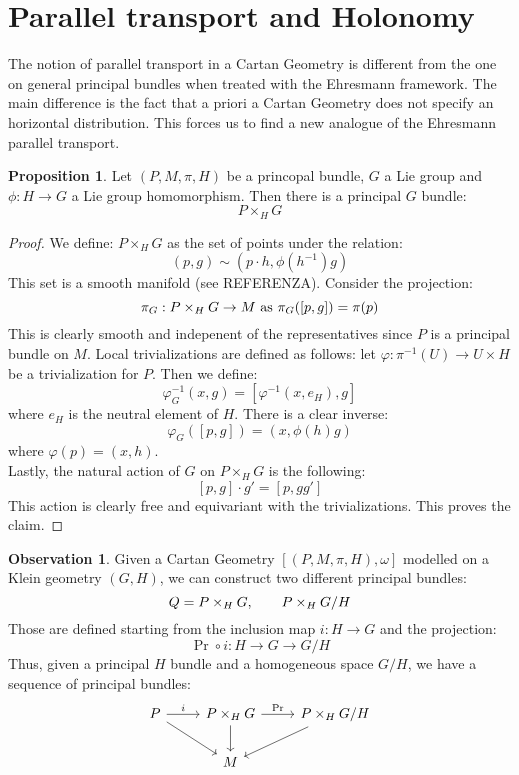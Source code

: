 \documentclass[12pt,a4paper]{report}
\theoremstyle{definition}
\theoremstyle{Theorem}
\newtheorem{Prop}[Def]{Proposition}
\theoremstyle{definition}
\theoremstyle{definition}
\newtheorem{Obs}[Def]{Observation}
\begin{document}
	\section{Parallel transport and Holonomy}
	The notion of parallel transport in a Cartan Geometry is different from the one on general principal bundles when treated with the Ehresmann framework. The main difference is the fact that a priori a Cartan Geometry does not specify an horizontal distribution. This forces us to find a new analogue of the Ehresmann parallel transport.
	\begin{Prop}
		Let $(P,M,\pi,H)$ be a princopal bundle, $G$ a Lie group and $\phi: H\rightarrow G$ a Lie group homomorphism. Then there is a principal $G$ bundle:
		$$P\times_H G$$
	\end{Prop}
	\begin{proof}
		We define: $P\times_H G$ as the set of points under the relation:
		$$(p,g)\sim(p\cdot h,\phi(h^{-1})g)$$
		This set is a smooth manifold (see REFERENZA). Consider the projection:
		$$\pi_G: P\times_H G\rightarrow M\hbox{ as }\pi_G([p,g])=\pi(p)$$
		This is clearly smooth and indepenent of the representatives since $P$ is a principal bundle on $M$. Local trivializations are defined as follows: let $\varphi:\pi^{-1}(U)\rightarrow U\times H$ be a trivialization for $P$. Then we define:
		$$\varphi_G^{-1}(x,g)=[\varphi^{-1}(x,e_H),g]$$
		where $e_H$ is the neutral element of $H$. There is a clear inverse: 
		$$\varphi_G([p,g])=(x,\phi(h)g)$$
		where $\varphi(p)=(x,h)$.\\
		Lastly, the natural action of $G$ on $P\times_H G$ is the following:
		$$[p,g]\cdot g'=[p,gg']$$
		This action is clearly free and equivariant with the trivializations. This proves the claim.
	\end{proof}
	\begin{Obs}
		Given a Cartan Geometry $[(P,M,\pi,H),\omega]$ modelled on a Klein geometry $(G,H)$, we can construct two different principal bundles:
		$$Q=P\times_H G, \hspace{20 pt}P\times_H G/H$$
		Those are defined starting from the inclusion map $i:H\rightarrow G$ and the projection:
		$$\Pr\circ i:H\rightarrow G\rightarrow G/H$$
		Thus, given a principal $H$ bundle and a homogeneous space $G/H$, we have a sequence of principal bundles:
		$$\begin{tikzcd}
			P \arrow{dr}\arrow{r}{i}& P\times_H \arrow{d} G\arrow{r}{\Pr} &P\times_H G/H \arrow{dl} \\
			& M &
		\end{tikzcd}$$
	\end{Obs}
\end{document}
